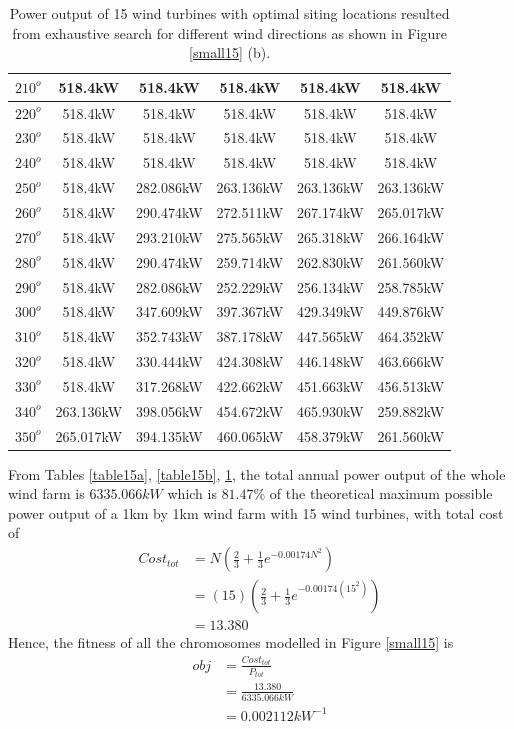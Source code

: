 \begin{table}[H]
\begin{tabular}{|c|c|c|c|c|c|}
		$210^o$	& 518.4kW	& 518.4kW	& 518.4kW	& 518.4kW	& 518.4kW	\\ \hline
		$220^o$	& 518.4kW	& 518.4kW	& 518.4kW	& 518.4kW	& 518.4kW	\\ \hline
		$230^o$	& 518.4kW	& 518.4kW	& 518.4kW	& 518.4kW	& 518.4kW	\\ \hline
		$240^o$	& 518.4kW	& 518.4kW	& 518.4kW	& 518.4kW	& 518.4kW	\\ \hline
		$250^o$	& 518.4kW	& 282.086kW	& 263.136kW	& 263.136kW	& 263.136kW	\\ \hline
		$260^o$	& 518.4kW	& 290.474kW	& 272.511kW	& 267.174kW	& 265.017kW	\\ \hline
		$270^o$	& 518.4kW	& 293.210kW	& 275.565kW	& 265.318kW	& 266.164kW	\\ \hline
		$280^o$	& 518.4kW	& 290.474kW	& 259.714kW	& 262.830kW	& 261.560kW	\\ \hline
		$290^o$	& 518.4kW	& 282.086kW	& 252.229kW	& 256.134kW	& 258.785kW	\\ \hline
		$300^o$	& 518.4kW	& 347.609kW	& 397.367kW	& 429.349kW	& 449.876kW	\\ \hline
		$310^o$	& 518.4kW	& 352.743kW	& 387.178kW	& 447.565kW	& 464.352kW	\\ \hline
		$320^o$	& 518.4kW	& 330.444kW	& 424.308kW	& 446.148kW	& 463.666kW	\\ \hline
		$330^o$	& 518.4kW	& 317.268kW	& 422.662kW	& 451.663kW	& 456.513kW	\\ \hline
		$340^o$	& 263.136kW	& 398.056kW	& 454.672kW	& 465.930kW	& 259.882kW	\\ \hline
		$350^o$	& 265.017kW	& 394.135kW	& 460.065kW	& 458.379kW	& 261.560kW	\\ \hline
        	\end{tabular}
        	\caption{Power output of 15 wind turbines with optimal siting locations resulted from exhaustive search for different wind directions as shown in Figure \ref{small15} (b).}
        	\label{table15c}
        \end{table}
        \doublespacing
        
        From Tables \ref{table15a}, \ref{table15b}, \ref{table15c}, the total annual power output of the whole wind farm is $6335.066kW$ which is $81.47\%$ of the theoretical maximum possible power output of a 1km by 1km wind farm with 15 wind turbines, with total cost of
        \begin{align*}
            Cost_{tot}
            &= N\left(\frac{2}{3} + \frac{1}{3}e^{-0.00174N^2}\right) \\
            &= \left(15\right)\left(\frac{2}{3} + \frac{1}{3}e^{-0.00174\left(15^2\right)}\right) \\
            &=13.380
        \end{align*}
        Hence, the fitness of all the chromosomes modelled in Figure \ref{small15} is
        \begin{align*}
            obj
            &=\frac{Cost_{tot}}{P_{tot}} \\
            &=\frac{13.380}{6335.066kW} \\
            &=0.002112kW^{-1}
        \end{align*}
        
